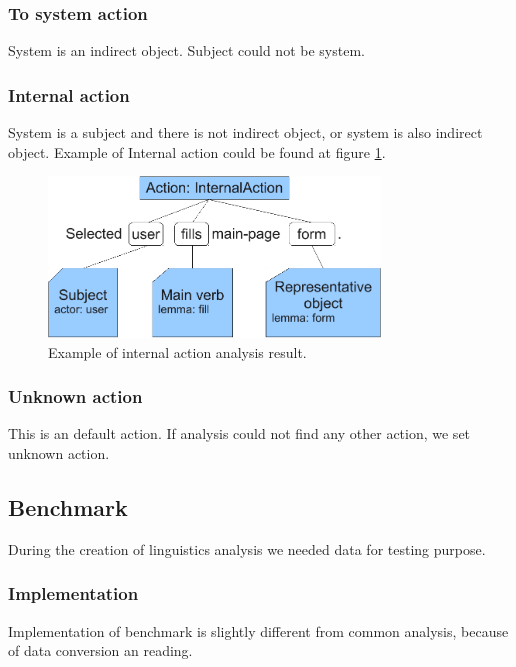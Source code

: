 \subsubsection{To system action}
System is an indirect object. Subject could not be system.

\subsubsection{Internal action}
System is a subject and there is not indirect object, or system is also indirect object. Example of Internal action could be found at figure \ref{fig:InternalActionExample}. 

\begin{figure}[ht]
  \centering
  \includegraphics[width=250pt]{images/InternalActionExample}
  \caption{Example of internal action analysis result.}
  \label{fig:InternalActionExample}
\end{figure}

\subsubsection{Unknown action}
This is an default action. If analysis could not find any other action, we set unknown action. 

\subsection{Benchmark}
\label{sec:benchmark}

During the creation of linguistics analysis we needed data for testing purpose.

\subsubsection{Implementation}

Implementation of benchmark is slightly different from common analysis, because of data conversion an reading.

